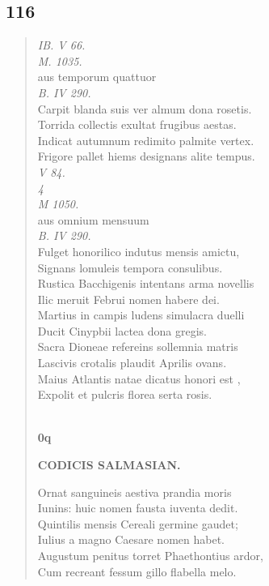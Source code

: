 \documentclass[11pt, a4paper]{report}
\begin{document}
            \subsection*{116}
      \begin{verse}
      \textit{IB. V 66.} \\ \textit{M. 1035.} \\ aus temporum quattuor \\ \textit{B. IV 290.} \\ Carpit blanda suis ver almum dona rosetis. \\ Torrida collectis exultat frugibus aestas. \\ Indicat autumnum redimito palmite vertex. \\ Frigore pallet hiems designans alite tempus. \\ \textit{V 84.} \\ \textit{4} \\ \textit{M 1050.} \\ aus omnium mensuum \\ \textit{B. IV 290.} \\ Fulget honorilico indutus mensis amictu, \\ Signans lomuleis tempora consulibus. \\ Rustica Bacchigenis intentans arma novellis \\ Ilic meruit Februi nomen habere dei. \\ Martius in campis ludens simulacra duelli \\ Ducit Cinypbii lactea dona gregis. \\ Sacra Dioneae refereins sollemnia matris \\ Lascivis crotalis plaudit Aprilis ovans. \\ Maius Atlantis natae dicatus honori  \lbrack est \rbrack , \\ Expolit et pulcris florea serta rosis. \\ 
        ﻿\pagebreak 
    \begin{center} \textbf{0q} \end{center}\begin{center} \textbf{CODICIS SALMASIAN.} \end{center}Ornat sanguineis aestiva prandia moris \\ Iunins: huic nomen fausta iuventa dedit. \\ Quintilis mensis Cereali germine gaudet; \\ Iulius a magno Caesare nomen habet. \\ Augustum penitus torret Phaethontius ardor, \\ Cum recreant fessum gillo flabella melo. \\ 
      \end{verse}
  
\end{document}
